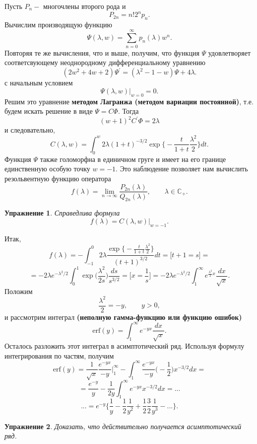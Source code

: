 \documentclass[12pt,a4paper]{article}
\theoremstyle{plain}   \newtheorem{Pro}{Задача}
\newtheorem{Exe}{Упражнение}
\begin{document}
Пусть
$ P_n - $
многочлены второго рода и
$$
  P_{2n}=n!2^n p_n .
$$
Вычислим производящую функцию
$$
  \Psi (\lambda , w)=\sum _{n=0}^{\infty}p_n (\lambda )w^n .
$$
Повторяя те же вычисления, что и выше, получим, что
функция
$ \Psi $
удовлетворяет соответсвующему неоднородному дифференциальному
уравнению
$$
  (2w^2 +4w+2)\Psi ^{\prime}=
  (\lambda ^2 -1-w)\Psi +4\lambda .
$$
с начальным условием
$$
  \Psi (\lambda ,w) \biggr | _{w=0}=0.
$$
Решим это уравнение
{\bfseries методом Лагранжа (методом вариации постоянной)},
т.е. будем искать решение в виде
$ \Psi =C\Phi . $
Тогда
$$
  (w+1)^2 C^{\prime}\Phi =2\lambda
$$
и следовательно,
$$
  C(\lambda , w)=\int _0 ^w 2\lambda
  (1+t)^{-3/2}\exp \biggl \{
  -\frac{t}{1+t}\frac{\lambda ^2}{2} \biggr \} dt .
$$
Функция
$ \Psi $
также голоморфна в единичном груге и имеет на его границе
единственную особую точку
$ w=-1. $
Это наблюдение позволяет нам вычислить резольвентную функцию оператора
$$
  f(\lambda )=\lim _{n \rightarrow \infty}
  \frac{P_{2n}(\lambda )}{Q_{2n}(\lambda )},
  \qquad \lambda \in \mathbb{C}_+ .
$$
\begin{Exe}
Справедлива формула
$$
  f(\lambda )=C(\lambda ,w) \biggr | _{w=-1}.
$$
\end{Exe}
Итак,
$$
  f(\lambda )=- \int _{-1}^0 2\lambda
  \frac{\exp \bigl \{ -\frac{t}{1+t}\frac{\lambda ^2}{2}  \bigr \} }
  {(t+1)^{3/2}}dt=
  \biggl [ t+1=s \biggr ] =
$$
$$
  =-2\lambda e^{-\lambda ^2/2}\int _0 ^1 \exp
   \biggl ( \frac{\lambda ^2}{2s}
  \biggr ) \frac{ds}{s^{3/2}}=
  \biggl [ x=\frac{1}{s} \biggr ] =
  -2\lambda e^{-\lambda ^2 /2}
   \int _1 ^{\infty} e^{\frac{\lambda ^2}{2}x}
   \frac{dx}{\sqrt{x}} .
$$
Положим
$$
  \frac{\lambda ^2}{2}=-y, \qquad y>0 ,
$$
и рассмотрим интеграл
{\bfseries (неполную гамма-функцию или функцию ошибок)}
$$
  \mathrm{erf} (y)=\int _1 ^{\infty} e^{-yx}
  \frac{dx}{\sqrt{x}}.
$$
Осталось разложить этот интеграл в асимптотический ряд.
Используя формулу интегрирования по частям, получим
$$
  \mathrm{erf}(y)=
  \frac{1}{\sqrt{x}}\frac{e^{-yx}}{-y} \biggr | _1 ^{\infty} -
  \int _1 ^{\infty}\frac{e^{-yx}}{-y}\biggl (-\frac{1}{2} \biggr )
  x^{-3/2}dx=
$$
$$
  =\frac{e^{-y}}{y} - \frac{1}{2y} \int _1 ^{\infty}
  e^{-yx}x^{-3/2}dx=...
$$
$$
  ...=e^{-y} \biggl \{
  \frac{1}{y} - \frac{1}{2}\frac{1}{y^2}+
  \frac{1}{2}\frac{3}{2} \frac{1}{y^3} -... \biggr \}.
$$
\begin{Exe}
Доказать, что действительно получается асимптотический ряд.
\end{Exe}
\end{document}
